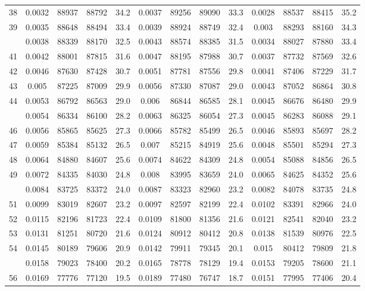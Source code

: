 \documentclass[
  14pt,
]{article}
\begin{document}
\begin{longtable}[t]{lcccccccccccc}
38 & 0.0032 & 88937 & 88792 & 34.2 & 0.0037 & 89256 & 89090 & 33.3 & 0.0028 & 88537 & 88415 & 35.2\\
39 & 0.0035 & 88648 & 88494 & 33.4 & 0.0039 & 88924 & 88749 & 32.4 & 0.003 & 88293 & 88160 & 34.3\\
\addlinespace
40 & 0.0038 & 88339 & 88170 & 32.5 & 0.0043 & 88574 & 88385 & 31.5 & 0.0034 & 88027 & 87880 & 33.4\\
41 & 0.0042 & 88001 & 87815 & 31.6 & 0.0047 & 88195 & 87988 & 30.7 & 0.0037 & 87732 & 87569 & 32.6\\
42 & 0.0046 & 87630 & 87428 & 30.7 & 0.0051 & 87781 & 87556 & 29.8 & 0.0041 & 87406 & 87229 & 31.7\\
43 & 0.005 & 87225 & 87009 & 29.9 & 0.0056 & 87330 & 87087 & 29.0 & 0.0043 & 87052 & 86864 & 30.8\\
44 & 0.0053 & 86792 & 86563 & 29.0 & 0.006 & 86844 & 86585 & 28.1 & 0.0045 & 86676 & 86480 & 29.9\\
\addlinespace
45 & 0.0054 & 86334 & 86100 & 28.2 & 0.0063 & 86325 & 86054 & 27.3 & 0.0045 & 86283 & 86088 & 29.1\\
46 & 0.0056 & 85865 & 85625 & 27.3 & 0.0066 & 85782 & 85499 & 26.5 & 0.0046 & 85893 & 85697 & 28.2\\
47 & 0.0059 & 85384 & 85132 & 26.5 & 0.007 & 85215 & 84919 & 25.6 & 0.0048 & 85501 & 85294 & 27.3\\
48 & 0.0064 & 84880 & 84607 & 25.6 & 0.0074 & 84622 & 84309 & 24.8 & 0.0054 & 85088 & 84856 & 26.5\\
49 & 0.0072 & 84335 & 84030 & 24.8 & 0.008 & 83995 & 83659 & 24.0 & 0.0065 & 84625 & 84352 & 25.6\\
\addlinespace
50 & 0.0084 & 83725 & 83372 & 24.0 & 0.0087 & 83323 & 82960 & 23.2 & 0.0082 & 84078 & 83735 & 24.8\\
51 & 0.0099 & 83019 & 82607 & 23.2 & 0.0097 & 82597 & 82199 & 22.4 & 0.0102 & 83391 & 82966 & 24.0\\
52 & 0.0115 & 82196 & 81723 & 22.4 & 0.0109 & 81800 & 81356 & 21.6 & 0.0121 & 82541 & 82040 & 23.2\\
53 & 0.0131 & 81251 & 80720 & 21.6 & 0.0124 & 80912 & 80412 & 20.8 & 0.0138 & 81539 & 80976 & 22.5\\
54 & 0.0145 & 80189 & 79606 & 20.9 & 0.0142 & 79911 & 79345 & 20.1 & 0.015 & 80412 & 79809 & 21.8\\
\addlinespace
55 & 0.0158 & 79023 & 78400 & 20.2 & 0.0165 & 78778 & 78129 & 19.4 & 0.0153 & 79205 & 78600 & 21.1\\
56 & 0.0169 & 77776 & 77120 & 19.5 & 0.0189 & 77480 & 76747 & 18.7 & 0.0151 & 77995 & 77406 & 20.4\\

\end{longtable}
\end{document}
